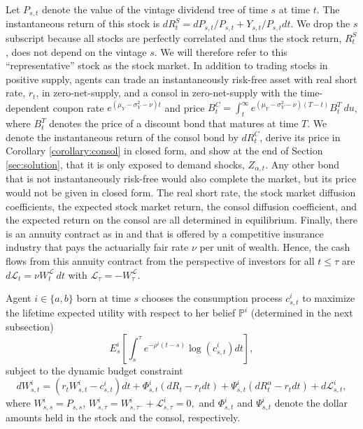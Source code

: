 \documentclass[preprint,11pt,authoryear]{elsarticle}
\theoremstyle{plain}
\begin{document}
Let $P_{s,t}$ denote the value of the vintage dividend tree of time $s$ at time $t$. The instantaneous return of this stock is $dR^S_{t} = dP_{s,t}/P_{s,t} + Y_{s,t}/P_{s,t} dt$.
We drop the $s$ subscript because all stocks are perfectly correlated and thus the stock return, $R^S_{t}$, does not depend on the vintage $s$.  We will therefore refer to this ``representative'' stock as the stock market. In addition to trading stocks in positive supply, agents can trade an instantaneously risk-free asset with real short rate, $r_t$, in zero-net-supply, and a consol in zero-net-supply with the time-dependent coupon rate $e^{(\mu_Y - \sigma_Y^2 - \nu)  t}$ and price $B^{C}_t =  \int_{t}^{\infty} e^{(\mu_Y - \sigma_Y^2 - \nu) (T-t)} B^{T}_{t} \: du $, %
where $B^{T}_{t} $ denotes the price of a discount bond that matures at time $T$. We denote the instantaneous return of the consol bond by $dR^{C}_t$, derive its price in Corollary \ref{corollary:consol} in closed form, and show at the end of Section \ref{sec:solution}, that it is only exposed to demand shocks, $Z_{\alpha,t}$. Any other bond that is not instantaneously risk-free would also complete the market, but its price would not be given in closed form. The real short rate, the stock market diffusion coefficients, the expected stock market return, the consol diffusion coefficient, and the expected return on the consol are all determined in equilibrium.  Finally, there is an annuity contract as in \cite{Blanchard2013} and \cite{Garleanu2008} that is offered by a competitive insurance industry that pays the actuarially fair rate $\nu$ per unit of wealth. Hence, the cash flows from this annuity contract from the perspective of investors for all $t \leq \tau$ are $ d \mathcal{L}_t =  \nu W^\mathcal{L}_{t} \: dt$ with $\mathcal{L}_{\tau} = -W^{\mathcal{L}}_{\tau}$.

Agent $i \in \{a,b\}$ born at time $s$ chooses the consumption process $c^i_{s,t}$ to maximize the lifetime expected utility with respect to her belief $\mathbb{P}^i$ (determined in the next subsection)
\begin{equation} \label{EUdynamic}
	E^i_{s}\left[\int_{s}^{\tau}e^{-\rho^i \left(t-s\right)} \log\left(c^i_{s,t}\right)dt\right],
\end{equation}
subject to the dynamic budget constraint
\begin{equation} \label{wealthdynamics} 
	dW^i_{s,t} = \left(r_tW^i_{s,t} - c^i_{s,t}\right)dt + \Phi^i_{s,t}\left(dR_{t}-r_tdt\right) +\Psi^i_{s,t}\left(dR^{\alpha}_t-r_tdt\right) + d \mathcal{L}_{s,t}^i,
\end{equation}
where $W^i_{s,s} = P_{s,s}$, $W^i_{s,\tau} =W^i_{s,\tau^{-}} + \mathcal{L}_{s,\tau}^i = 0,$ and $\Phi^i_{s,t}$ and $\Psi^i_{s,t}$ denote the dollar amounts held in the stock and the consol, respectively.  
\end{document}
